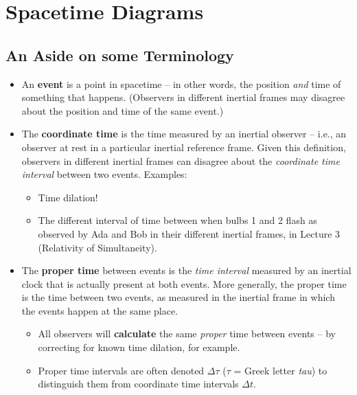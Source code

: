 \documentclass[11pt, letterpaper, openany]{book}
\begin{document}
\chapter{Spacetime Diagrams}

\section{An Aside on some Terminology}

\begin{itemize}
    \item An \textbf{event} is a point in spacetime -- in other words, the position \textit{and} time of something that happens. (Observers in different inertial frames may disagree about the position and time of the same event.)
    \item The \textbf{coordinate time} is the time measured by an inertial observer -- i.e., an observer at rest in a particular inertial reference frame. Given this definition, observers in different inertial frames can disagree about the \textit{coordinate time interval} between two events. Examples:
    \begin{itemize}
        \item Time dilation!
        \item The different interval of time between when bulbs 1 and 2 flash as observed by Ada and Bob in their different inertial frames, in Lecture 3 (Relativity of Simultaneity).
    \end{itemize}
    \item The \textbf{proper time} between events is the \textit{time interval} measured by an inertial clock that is actually present at both events. More generally, the proper time is the time between two events, as measured in the inertial frame in which the events happen at the same place.
    \begin{itemize}
        \item All observers will \textbf{calculate} the same \textit{proper} time between events -- by correcting for known time dilation, for example.
        \item Proper time intervals are often denoted $\Delta \tau$ ($\tau$ = Greek letter \textit{tau}) to distinguish them from coordinate time intervals $\Delta t$.
    \end{itemize}
\end{itemize}
\end{document}

